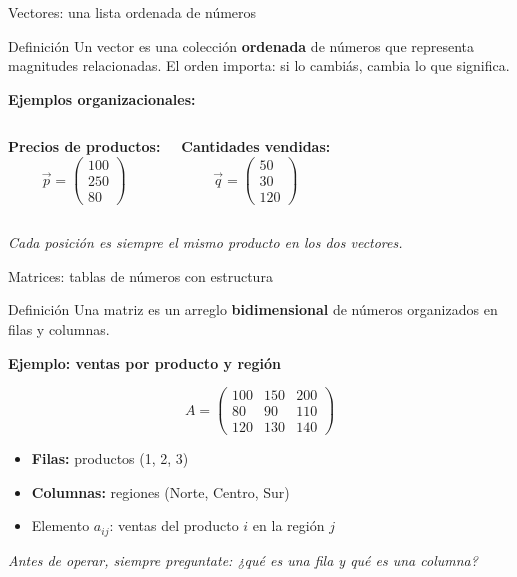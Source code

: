 \documentclass[aspectratio=169,10pt]{beamer}
\begin{document}
\begin{frame}{Vectores: una lista ordenada de números}

\begin{block}{Definición}
Un vector es una colección \textbf{ordenada} de números que representa magnitudes relacionadas.
El orden importa: si lo cambiás, cambia lo que significa.
\end{block}

\vspace{0.3cm}
\textbf{Ejemplos organizacionales:}

\begin{columns}[T]
\textbf{Precios de productos:}
$$\vec{p} = \begin{pmatrix} 100 \\ 250 \\ 80 \end{pmatrix}$$

\textbf{Cantidades vendidas:}
$$\vec{q} = \begin{pmatrix} 50 \\ 30 \\ 120 \end{pmatrix}$$
\end{columns}

\vspace{0.4cm}
\begin{center}
\textit{Cada posición es siempre el mismo producto en los dos vectores.}
\end{center}
\end{frame}

\begin{frame}{Matrices: tablas de números con estructura}

\begin{block}{Definición}
Una matriz es un arreglo \textbf{bidimensional} de números organizados en filas y columnas.
\end{block}

\vspace{0.3cm}
\textbf{Ejemplo: ventas por producto y región}

$$A = \begin{pmatrix}
100 & 150 & 200 \\
80 & 90 & 110 \\
120 & 130 & 140
\end{pmatrix}$$

\begin{itemize}
    \item \textbf{Filas:} productos (1, 2, 3)
    \item \textbf{Columnas:} regiones (Norte, Centro, Sur)
    \item Elemento $a_{ij}$: ventas del producto $i$ en la región $j$
\end{itemize}

\vspace{0.2cm}
\begin{center}
\textit{Antes de operar, siempre preguntate: ¿qué es una fila y qué es una columna?}
\end{center}
\end{frame}
\end{document}

